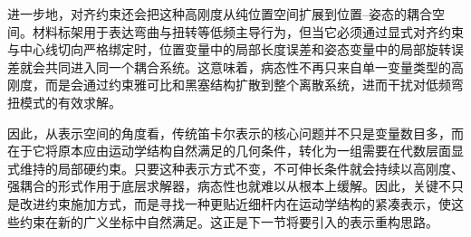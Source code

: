 进一步地，对齐约束还会把这种高刚度从纯位置空间扩展到位置--姿态的耦合空间。材料标架用于表达弯曲与扭转等低频主导行为，但当它必须通过显式对齐约束与中心线切向严格绑定时，位置变量中的局部长度误差和姿态变量中的局部旋转误差就会共同进入同一个耦合系统。这意味着，病态性不再只来自单一变量类型的高刚度，而是会通过约束雅可比和黑塞结构扩散到整个离散系统，进而干扰对低频弯扭模式的有效求解。

因此，从表示空间的角度看，传统笛卡尔表示的核心问题并不只是变量数目多，而在于它将原本应由运动学结构自然满足的几何条件，转化为一组需要在代数层面显式维持的局部硬约束。只要这种表示方式不变，不可伸长条件就会持续以高刚度、强耦合的形式作用于底层求解器，病态性也就难以从根本上缓解。因此，关键不只是改进约束施加方式，而是寻找一种更贴近细杆内在运动学结构的紧凑表示，使这些约束在新的广义坐标中自然满足。这正是下一节将要引入的表示重构思路。
